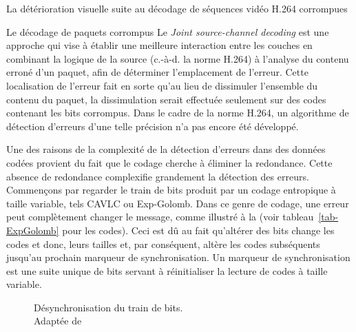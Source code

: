 \begin{chapter}{La détérioration visuelle suite au décodage de séquences vidéo H.264 corrompues}
\begin{section}{Le décodage de paquets corrompus}
Le \textit{Joint source-channel decoding} \citep{Duhamel2010} est une approche
qui vise à établir une meilleure interaction entre les couches en combinant la
logique de la source (c.-à-d. la norme H.264) à l'analyse du contenu erroné d'un
paquet, afin de déterminer l'emplacement de l'erreur. Cette localisation de
l'erreur fait en sorte qu'au lieu de dissimuler l'ensemble du contenu du paquet,
la dissimulation serait effectuée seulement sur des codes contenant les bits
corrompus. Dans le cadre de la norme H.264, un algorithme de détection
d'erreurs d'une telle précision n'a pas encore été développé.

Une des raisons de la complexité de la détection d'erreurs dans des données
codées provient du fait que le codage cherche à éliminer la redondance. Cette
absence de redondance complexifie grandement la détection des erreurs.
Commençons par regarder le train de bits produit par un codage entropique à
taille variable, tels CAVLC ou Exp-Golomb. Dans ce genre de codage, une erreur
peut complètement changer le message, comme illustré à la 
(voir tableau~\ref{tab-ExpGolomb} pour les codes). Ceci est dû au fait
qu'altérer des bits change les codes et donc, leurs tailles et, par conséquent,
altère les codes subséquents jusqu'au prochain marqueur de synchronisation. Un
marqueur de synchronisation est une suite unique de bits servant à réinitialiser
la lecture de codes à taille variable.

\begin{figure}
	\caption[Désynchronisation du train de bits]{Désynchronisation du train de
bits.\\ Adaptée de \citet[p.~11]{Ikuno2007}}
	\label{fig-BitDesync}
\end{figure}


\end{section}
\end{chapter}

